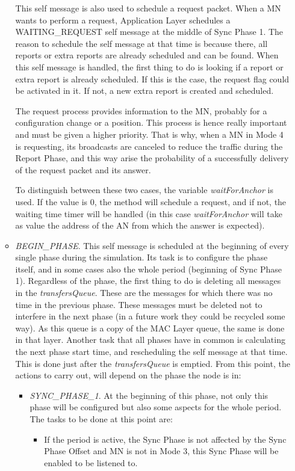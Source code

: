 \begin{itemize}
\begin{itemize}
    This self message is also used to schedule a request packet. When a \ac{MN} wants to perform a request, Application Layer schedules a 
    WAITING\_REQUEST self message at the middle of Sync Phase 1. The reason to schedule the self message at that time is because there, all 
    reports or extra reports are already scheduled and can be found. When this self message is handled, the first thing to do is looking if a 
    report or extra report is already scheduled. If this is the case, the request flag could be activated in it. If not, a new extra report is 
    created and scheduled.

    The request process provides information to the \ac{MN}, probably for a configuration change or a position. This process is hence really 
    important and must be given a higher priority. That is why, when a \ac{MN} in Mode 4 is requesting, its broadcasts are canceled 
    to reduce the traffic during the Report Phase, and this way arise the probability of a successfully delivery of the request packet and its
    answer.

    To distinguish between these two cases, the variable \textit{waitForAnchor} is used. If the value is 0, the method will schedule a request,
    and if not, the waiting time timer will be handled (in this case \textit{waitForAnchor} will take as value the address of the \ac{AN} from
    which the answer is expected).

    \item \textit{BEGIN\_PHASE}. This self message is scheduled at the beginning of every single phase during the simulation. Its task is to 
    configure the phase itself, and in some cases also the whole period (beginning of Sync Phase 1). Regardless of the phase, the first thing to
    do is deleting all messages in the \textit{transfersQueue}. These are the messages for which there was no time in the previous phase. These 
    messages must be deleted not to interfere in the next phase (in a future work they could be recycled some way). As this queue is a copy of the
    \ac{MAC} Layer queue, the same is done in that layer. Another task that all phases have in common is calculating the next phase start time,
    and rescheduling the self message at that time. This is done just after the \textit{transfersQueue} is emptied. From this point, the actions
    to carry out, will depend on the phase the node is in:
    \begin{itemize}
      \item \textit{SYNC\_PHASE\_1}. At the beginning of this phase, not only this phase will be configured but also some aspects for the whole
      period. The tasks to be done at this point are:
      \begin{itemize}
	\item If the period is active, the Sync Phase is not affected by the Sync Phase Offset and \ac{MN} is not in Mode 3, this Sync Phase will
	be enabled to be listened to.


\end{itemize}
\end{itemize}
\end{itemize}
\end{itemize}
